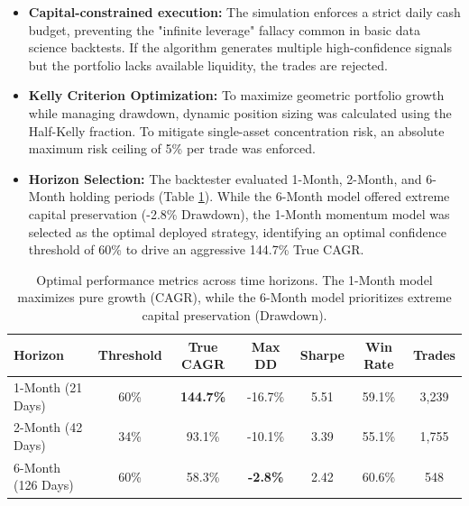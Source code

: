 \documentclass{article}
\begin{document}
\begin{itemize}
    \item \textbf{Capital-constrained execution:} The simulation enforces a strict daily cash budget, preventing the "infinite leverage" fallacy common in basic data science backtests. If the algorithm generates multiple high-confidence signals but the portfolio lacks available liquidity, the trades are rejected.
    \item \textbf{Kelly Criterion Optimization:} To maximize geometric portfolio growth while managing drawdown, dynamic position sizing was calculated using the Half-Kelly fraction. To mitigate single-asset concentration risk, an absolute maximum risk ceiling of 5\% per trade was enforced. 
    \item \textbf{Horizon Selection:} The backtester evaluated 1-Month, 2-Month, and 6-Month holding periods (Table \ref{tab:performance_metrics}). While the 6-Month model offered extreme capital preservation (-2.8\% Drawdown), the 1-Month momentum model was selected as the optimal deployed strategy, identifying an optimal confidence threshold of 60\% to drive an aggressive 144.7\% True CAGR.
\end{itemize}

\begin{table}[htbp]
    \centering
    \renewcommand{\arraystretch}{1.3} %
    \begin{tabular}{l c c c c c c}
        \hline
        \textbf{Horizon} & \textbf{Threshold} & \textbf{True CAGR} & \textbf{Max DD} & \textbf{Sharpe} & \textbf{Win Rate} & \textbf{Trades} \\ 
        \hline
        1-Month (21 Days) & 60\% & \textbf{144.7\%} & -16.7\% & 5.51 & 59.1\% & 3,239 \\ 
        2-Month (42 Days) & 34\% & 93.1\% & -10.1\% & 3.39 & 55.1\% & 1,755 \\ 
        6-Month (126 Days) & 60\% & 58.3\% & \textbf{-2.8\%} & 2.42 & 60.6\% & 548 \\ 
        \hline
    \end{tabular}
    \caption{Optimal performance metrics across time horizons. The 1-Month model maximizes pure growth (CAGR), while the 6-Month model prioritizes extreme capital preservation (Drawdown).}
    \label{tab:performance_metrics}
\end{table}
\end{document}
